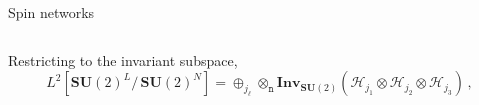 \documentclass{beamer}
\begin{document}
\begin{frame}{Spin networks}
    \begin{list}{\maltese}{\leftmargin=1em \itemindent=0em}
        \item<1-> \noindent
        \begin{minipage}{\linewidth}
            \begin{columns}
            \end{columns}
        \end{minipage}
        \item<2-> Restricting to the invariant subspace,
        \begin{equation}
            L^2[{\mathbf{SU}(2)}^L/\,{\mathbf{SU}(2)}^N]=\oplus_{j_\ell}\otimes_\mathtt{n}\mathbf{Inv}_{\mathbf{SU}(2)}(\mathcal{H}_{j_1}\otimes\mathcal{H}_{j_2}\otimes\mathcal{H}_{j_3})\,,

\end{equation}
\end{list}
\end{frame}
\end{document}
